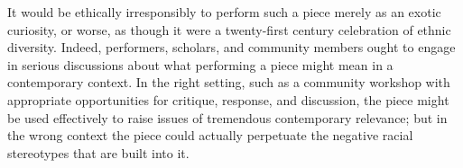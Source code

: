 It would be ethically irresponsibly to perform such a piece merely as an exotic
curiosity, or worse, as though it were a twenty-first century celebration of
ethnic diversity. 
Indeed, performers, scholars, and community members ought to engage in serious
discussions about what performing a piece might mean in a contemporary context.
In the right setting, such as a community workshop with appropriate
opportunities for critique, response, and discussion, the piece might be used 
effectively to raise issues of tremendous contemporary relevance; but in the
wrong context the piece could actually perpetuate the negative racial
stereotypes that are built into it.


